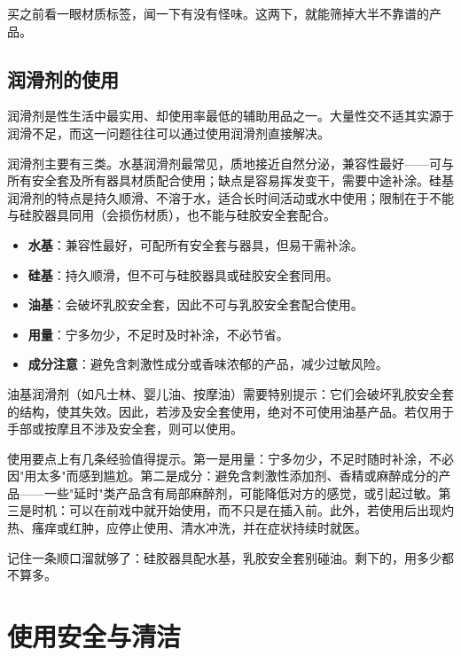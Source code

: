 \documentclass[12pt,UTF8]{ctexbook}
\newcommand{\keyword}[1]{\textbf{#1}}
\begin{document}
\begin{tcolorbox}[colback=pink!5!white,colframe=red!50!black,title=贴心小叮咛]
	买之前看一眼材质标签，闻一下有没有怪味。这两下，就能筛掉大半不靠谱的产品。
\end{tcolorbox}
\subsection{润滑剂的使用}

润滑剂是性生活中最实用、却使用率最低的辅助用品之一。大量性交不适其实源于润滑不足，而这一问题往往可以通过使用润滑剂直接解决。

润滑剂主要有三类。水基润滑剂最常见，质地接近自然分泌，兼容性最好——可与所有安全套及所有器具材质配合使用；缺点是容易挥发变干，需要中途补涂。硅基润滑剂的特点是持久顺滑、不溶于水，适合长时间活动或水中使用；限制在于不能与硅胶器具同用（会损伤材质），也不能与硅胶安全套配合。

\begin{itemize}
	\item \keyword{水基}：兼容性最好，可配所有安全套与器具，但易干需补涂。
	\item \keyword{硅基}：持久顺滑，但不可与硅胶器具或硅胶安全套同用。
	\item \keyword{油基}：会破坏乳胶安全套，因此不可与乳胶安全套配合使用。
	\item \keyword{用量}：宁多勿少，不足时及时补涂，不必节省。
	\item \keyword{成分注意}：避免含刺激性成分或香味浓郁的产品，减少过敏风险。
\end{itemize}

油基润滑剂（如凡士林、婴儿油、按摩油）需要特别提示：它们会破坏乳胶安全套的结构，使其失效。因此，若涉及安全套使用，绝对不可使用油基产品。若仅用于手部或按摩且不涉及安全套，则可以使用。

使用要点上有几条经验值得提示。第一是用量：宁多勿少，不足时随时补涂，不必因"用太多"而感到尴尬。第二是成分：避免含刺激性添加剂、香精或麻醉成分的产品——一些"延时"类产品含有局部麻醉剂，可能降低对方的感觉，或引起过敏。第三是时机：可以在前戏中就开始使用，而不只是在插入前。此外，若使用后出现灼热、瘙痒或红肿，应停止使用、清水冲洗，并在症状持续时就医。

\begin{tcolorbox}[colback=pink!5!white,colframe=red!50!black,title=贴心小叮咛]
	记住一条顺口溜就够了：硅胶器具配水基，乳胶安全套别碰油。剩下的，用多少都不算多。
\end{tcolorbox}

\section{使用安全与清洁}
\end{document}
